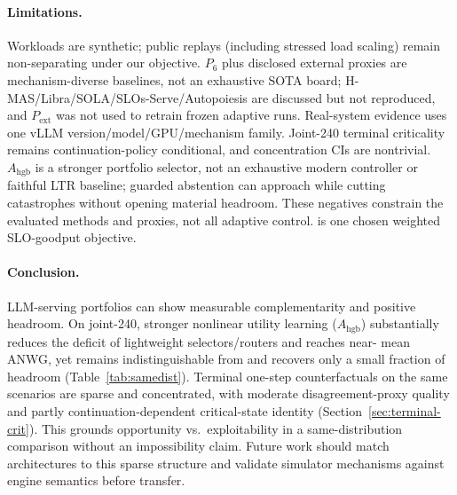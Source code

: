 \documentclass[runningheads]{llncs}
\begin{document}
\paragraph{Limitations.}
Workloads are synthetic; public replays (including stressed load scaling)
remain non-separating under our objective. $P_6$ plus disclosed external
proxies are mechanism-diverse baselines, not an exhaustive SOTA board;
H-MAS/Libra/SOLA/SLOs-Serve/Autopoiesis are discussed but not reproduced,
and $P_{\mathrm{ext}}$ was not used to retrain frozen adaptive runs.
Real-system evidence uses one vLLM version/model/GPU/mechanism family.
Joint-240 terminal criticality remains continuation-policy conditional, and
concentration CIs are nontrivial. $A_{\mathrm{hgb}}$ is a stronger portfolio
selector, not an exhaustive modern controller or faithful LTR baseline;
guarded abstention can approach \sbs{} while cutting catastrophes without
opening material \vbs{} headroom. These negatives constrain the evaluated
methods and proxies, not all adaptive control. \anwg{} is one chosen
weighted SLO-goodput objective.

\paragraph{Conclusion.}
LLM-serving portfolios can show measurable complementarity and positive
\vbs{} headroom. On joint-240, stronger nonlinear utility learning
($A_{\mathrm{hgb}}$) substantially reduces the deficit of lightweight
selectors/routers and reaches near-\sbs{} mean ANWG, yet remains
indistinguishable from \sbs{} and recovers only a small fraction of headroom
(Table~\ref{tab:samedist}). Terminal one-step counterfactuals on the same
scenarios are sparse and concentrated, with moderate disagreement-proxy
quality and partly continuation-dependent critical-state identity
(Section~\ref{sec:terminal-crit}). This grounds opportunity vs.\
exploitability in a same-distribution comparison without an impossibility
claim. Future work should match architectures to this sparse structure and
validate simulator mechanisms against engine semantics before transfer.
\end{document}
